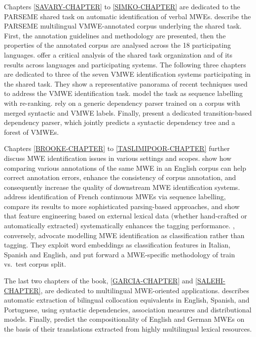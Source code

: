 \documentclass[output=paper,
modfonts,
]{langscibook}
\begin{document}
Chapters \ref{SAVARY-CHAPTER} to \ref{SIMKO-CHAPTER} %
are dedicated to the PARSEME shared task on automatic identification of verbal MWEs.  describe %
the PARSEME multilingual VMWE-annotated corpus underlying the shared task. First, the annotation guidelines and methodology are presented, then 
the properties of the annotated corpus are analysed across the 18 participating languages.  offer a critical analysis of the shared task organization and of its results across languages and participating systems. The following three chapters %
are dedicated to three of the seven %
VMWE identification systems participating in the shared task. They show a representative panorama of recent techniques used to address the VMWE identification task.   model the task as sequence labelling with re-ranking.   rely on a generic dependency parser trained on a corpus with merged syntactic and VMWE labels. Finally,  present a dedicated transition-based dependency parser, which jointly predicts a syntactic dependency tree and a forest of VMWEs. 

Chapters \ref{BROOKE-CHAPTER} to \ref{TASLIMIPOOR-CHAPTER} further discuss MWE identification issues in various settings and scopes.  show how comparing various annotations of the same MWE in an English corpus can help correct annotation errors, enhance the consistency of corpus annotation, and consequently increase the quality of downstream MWE identification systems.  address identification of French continuous MWEs via sequence labelling, compare its results to more sophisticated parsing-based approaches, and show that feature engineering based on external lexical data (whether hand-crafted or automatically extracted) systematically enhances the tagging performance. , conversely, advocate 
modelling MWE identification as classification rather than tagging. They exploit word embeddings as classification features in Italian, Spanish and English, and put forward a MWE-specific methodology of train vs.~test corpus split.

The last two chapters of the book, \ref{GARCIA-CHAPTER} and \ref{SALEHI-CHAPTER}, %
are dedicated to multilingual MWE-oriented applications.  describes automatic extraction of bilingual collocation equivalents in English, Spanish, and Portuguese, using
syntactic dependencies, association measures and distributional models. Finally,   predict the compositionality of English and German MWEs on the basis of their translations extracted from highly multilingual lexical resources. 
\end{document}
